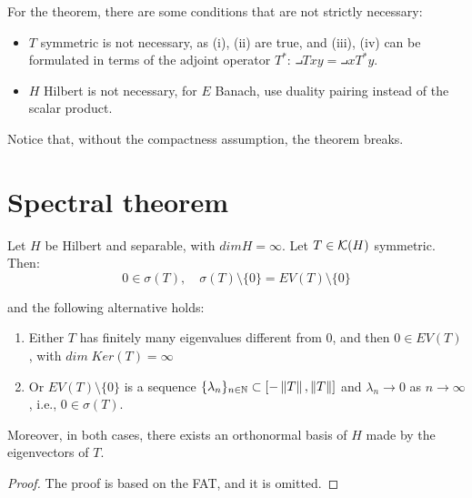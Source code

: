 \begin{fremark}
    For the theorem, there are some conditions that are not strictly necessary:
    \vspace{1em}
    \begin{itemize}
        \item $T$ symmetric is not necessary, as (i), (ii) are true, and (iii), (iv)
        can be formulated in terms of the adjoint operator $T^*$: $\intprod{Tx}{y} = \intprod{x}{T^*y}$.

        \vspace{1em}
        \item $H$ Hilbert is not necessary, for $E$ Banach, use duality pairing instead of 
        the scalar product.
    \end{itemize}
    \vspace{1em}
    Notice that, without the compactness assumption, the theorem breaks.
\end{fremark}

\section{Spectral theorem}

\begin{ftheorem}
    Let $H$ be Hilbert and separable, with $dim H = \infty$. Let $T \in \mathcal{K}(H)$ symmetric.
    Then: 
    $$0 \in \sigma(T), \quad \sigma(T) \setminus \{0\} = EV(T) \setminus \{0\}$$

    and the following alternative holds:
    \vspace{1em}
    \begin{enumerate}[label=(\roman*)]
        \item Either $T$ has finitely many eigenvalues different from 0, and then
        $0 \in EV(T)$, with $dim \; Ker(T) = \infty$
        \vspace{1em}
        \item Or $EV(T) \setminus \{0\}$ is a sequence $\{\lambda_n\}_{n \in \mathbb{N}} \subset [-\left\|T\right\|, \left\|T\right\|]$
        and $\lambda_n \to 0$ as $n \to \infty$, i.e., $0 \in \sigma(T)$.
    \end{enumerate}
    \vspace{1em}
    Moreover, in both cases, there exists an orthonormal basis of $H$ made by the eigenvectors
    of $T$.
\end{ftheorem}

\begin{proof}
    The proof is based on the FAT, and it is omitted.

\end{proof}



